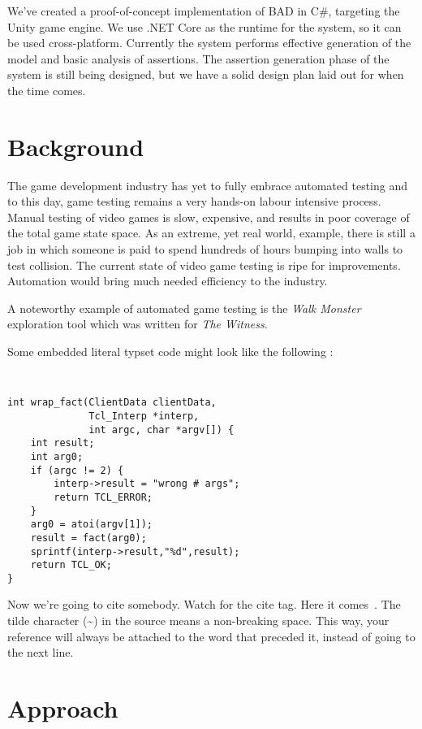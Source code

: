 \documentclass[letterpaper,twocolumn,10pt]{article}
\begin{document}
We've created a proof-of-concept implementation of BAD in C\#, targeting the Unity game engine. We use .NET Core as the runtime for the system, so it can be used cross-platform. Currently the system performs effective generation of the model and basic analysis of assertions. The assertion generation phase of the system is still being designed, but we have a solid design plan laid out for when the time comes.

\section{Background}

The game development industry has yet to fully embrace automated testing and to this day, game testing remains a very hands-on labour intensive process. Manual testing of video games is slow, expensive, and results in poor coverage of the total game state space. As an extreme, yet real world, example, there is still a job in which someone is paid to spend hundreds of hours bumping into walls to test collision. The current state of video game testing is ripe for improvements. Automation would bring much needed efficiency to the industry.

A noteworthy example of automated game testing is the \textit{Walk Monster}~\cite{WalkMonster} exploration tool which was written for \textit{The Witness}. 

Some embedded literal typset code might 
look like the following :

{\tt \small
\begin{verbatim}
int wrap_fact(ClientData clientData,
              Tcl_Interp *interp,
              int argc, char *argv[]) {
    int result;
    int arg0;
    if (argc != 2) {
        interp->result = "wrong # args";
        return TCL_ERROR;
    }
    arg0 = atoi(argv[1]);
    result = fact(arg0);
    sprintf(interp->result,"%d",result);
    return TCL_OK;
}
\end{verbatim}
}

Now we're going to cite somebody.  Watch for the cite tag.
Here it comes~\cite{Chaum1981,Diffie1976}.  The tilde character (\~{})
in the source means a non-breaking space.  This way, your reference will
always be attached to the word that preceded it, instead of going to the
next line.

\section{Approach}
\end{document}
